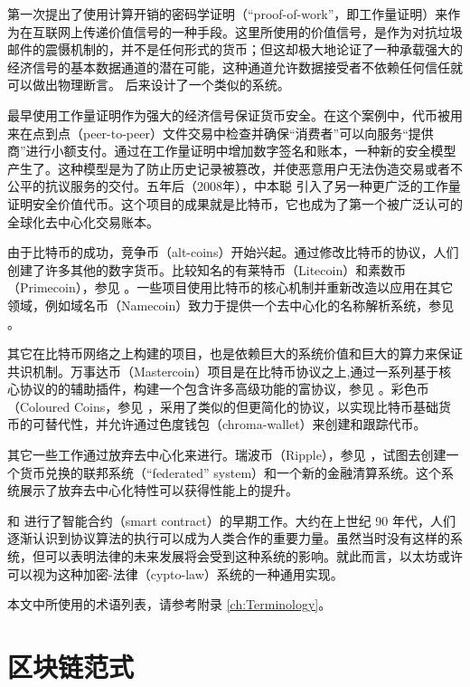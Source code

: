 \documentclass[9pt,oneside]{amsart}
\begin{document}
\begin{multicols}{2}
\cite{dwork92pricingvia} 第一次提出了使用计算开销的密码学证明（“proof-of-work”，即工作量证明）来作为在互联网上传递价值信号的一种手段。这里所使用的价值信号，是作为对抗垃圾邮件的震慑机制的，并不是任何形式的货币；但这却极大地论证了一种承载强大的经济信号的基本数据通道的潜在可能，这种通道允许数据接受者不依赖任何信任就可以做出物理断言。\cite{back2002hashcash} 后来设计了一个类似的系统。

\cite{vishnumurthy03karma:a} 最早使用工作量证明作为强大的经济信号保证货币安全。在这个案例中，代币被用来在点到点（peer-to-peer）文件交易中检查并确保“消费者”可以向服务“提供商”进行小额支付。通过在工作量证明中增加数字签名和账本，一种新的安全模型产生了。这种模型是为了防止历史记录被篡改，并使恶意用户无法伪造交易或者不公平的抗议服务的交付。五年后（2008年），中本聪 \cite{nakamoto2008bitcoin} 引入了另一种更广泛的工作量证明安全价值代币。这个项目的成果就是比特币，它也成为了第一个被广泛认可的全球化去中心化交易账本。

由于比特币的成功，竞争币（alt-coins）开始兴起。通过修改比特币的协议，人们创建了许多其他的数字货币。比较知名的有莱特币（Litecoin）和素数币（Primecoin），参见 \cite{sprankel2013technical} 。一些项目使用比特币的核心机制并重新改造以应用在其它领域，例如域名币（Namecoin）致力于提供一个去中心化的名称解析系统，参见 \cite{aron2012bitcoin} 。

其它在比特币网络之上构建的项目，也是依赖巨大的系统价值和巨大的算力来保证共识机制。万事达币（Mastercoin）项目是在比特币协议之上,通过一系列基于核心协议的的辅助插件，构建一个包含许多高级功能的富协议，参见 \cite{mastercoin2013willett} 。彩色币（Coloured Coins，参见 \cite{colouredcoins2012rosenfeld} ，采用了类似的但更简化的协议，以实现比特币基础货币的可替代性，并允许通过色度钱包（chroma-wallet）来创建和跟踪代币。

其它一些工作通过放弃去中心化来进行。瑞波币（Ripple），参见 \cite{boutellier2014pirates} ，试图去创建一个货币兑换的联邦系统（“federated” system）和一个新的金融清算系统。这个系统展示了放弃去中心化特性可以获得性能上的提升。

\cite{szabo1997formalizing} 和 \cite{miller1997future} 进行了智能合约（smart contract）的早期工作。大约在上世纪 90 年代，人们逐渐认识到协议算法的执行可以成为人类合作的重要力量。虽然当时没有这样的系统，但可以表明法律的未来发展将会受到这种系统的影响。就此而言，以太坊或许可以视为这种加密-法律（cypto-law）系统的一种通用实现。

本文中所使用的术语列表，请参考附录 \ref{ch:Terminology}。

\section{区块链范式} \label{ch:overview}


\end{multicols}
\end{document}
